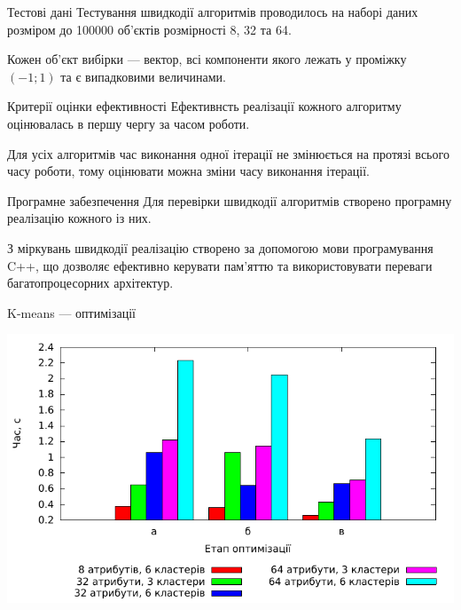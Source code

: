 \documentclass{beamer}
\begin{document}
    
    \begin{frame}{Тестові дані}
        Тестування швидкодії алгоритмів проводилось на наборі даних розміром до 100000 об’єктів розмірності 8, 32 та 64.
        
        Кожен об’єкт вибірки --- вектор, всі компоненти якого лежать у проміжку $(-1; 1)$ та є випадковими величинами.
    \end{frame}
    
    
    \begin{frame}{Критерії оцінки ефективності}
        Ефективнсть реалізації кожного алгоритму оцінювалась в першу чергу за часом роботи.
        
        Для усіх алгоритмів час виконання одної ітерації не змінюється на протязі всього часу роботи, тому оцінювати можна зміни часу виконання ітерації.
    \end{frame}
    
    \begin{frame}{Програмне забезпечення}
        Для перевірки швидкодії алгоритмів створено програмну реалізацію кожного із них.
        
        З міркувань швидкодії реалізацію створено за допомогою мови програмування C++, що дозволяє ефективно керувати пам’яттю та використовувати переваги багатопроцесорних архітектур.
    \end{frame}
    
    
    \begin{frame}{K-means --- оптимізації}
        \begin{center}
            \includegraphics[scale=0.8]{kmeans_iteration_average.pdf}
        \end{center}
    \end{frame}
    
\end{document}
